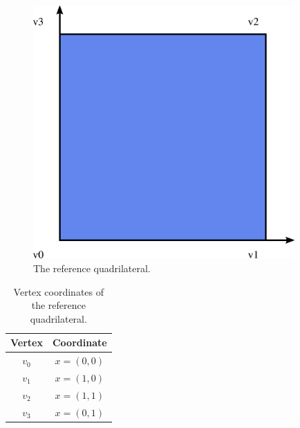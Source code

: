 \begin{figure}[H]
  \begin{center}
    \includegraphics[width=10cm]{eps/quadrilateral.eps}
    \caption{The reference quadrilateral.}
    \label{fig:quadrilateral}
  \end{center}
\end{figure}

\begin{table}[H]
\linespread{1.2}\selectfont
  \begin{center}
    \begin{tabular}{|c|c|}
      \hline
      Vertex & Coordinate \\
      \hline
      \hline
      $v_0$ & $x = (0, 0)$ \\
      \hline
      $v_1$ & $x = (1, 0)$ \\
      \hline
      $v_2$ & $x = (1, 1)$ \\
      \hline
      $v_3$ & $x = (0, 1)$ \\
      \hline
    \end{tabular}
    \caption{Vertex coordinates of the reference quadrilateral.}
    \label{tab:quadrilateral,vertices}
  \end{center}
\end{table}

